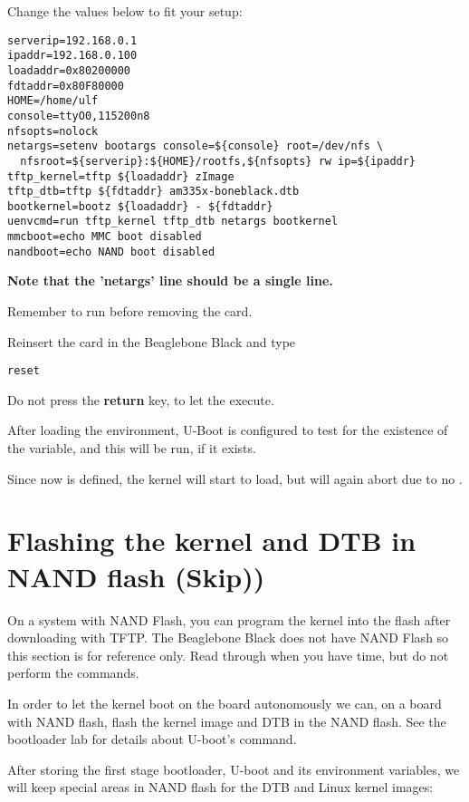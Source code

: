 Change the values below to fit your setup:

\begin{verbatim}
serverip=192.168.0.1
ipaddr=192.168.0.100
loadaddr=0x80200000
fdtaddr=0x80F80000
HOME=/home/ulf
console=ttyO0,115200n8
nfsopts=nolock
netargs=setenv bootargs console=${console} root=/dev/nfs \
  nfsroot=${serverip}:${HOME}/rootfs,${nfsopts} rw ip=${ipaddr}
tftp_kernel=tftp ${loadaddr} zImage
tftp_dtb=tftp ${fdtaddr} am335x-boneblack.dtb
bootkernel=bootz ${loadaddr} - ${fdtaddr}
uenvcmd=run tftp_kernel tftp_dtb netargs bootkernel
mmcboot=echo MMC boot disabled
nandboot=echo NAND boot disabled
\end{verbatim}

{\bf Note that the ’netargs’ line should be a single line.}

Remember to run  before removing the card.

Reinsert the card in the Beaglebone Black and type

\begin{verbatim}
reset
\end{verbatim}

Do not press the {\bf return} key, to let the  execute.

After loading the  environment, U-Boot is configured to test for
the existence of the \code{uenvcmd} variable, and this will be run, if it exists.

Since  now is defined, the kernel will start to load, but will again abort due to no .

\clearpage
\section{Flashing the kernel and DTB in NAND flash (Skip))}

On a system with NAND Flash, you can program the kernel into the flash
after downloading with TFTP. The Beaglebone Black does not have NAND Flash
so this section is for reference only. Read through when you have time, 
but do not perform the commands.

In order to let the kernel boot on the board autonomously we can,
on a board with NAND flash, flash the kernel image and DTB in the NAND flash. 
See the bootloader lab for details about U-boot's \code{nand} command.

After storing the first stage bootloader, U-boot and its environment
variables, we will keep special areas in NAND flash for the DTB
and Linux kernel images:

